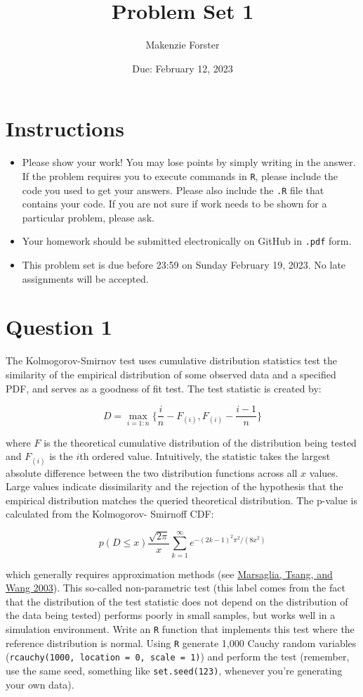\documentclass[12pt,letterpaper]{article}
\title{Problem Set 1}
\date{Due: February 12, 2023}
\author{Makenzie Forster}
\begin{document}
	\maketitle
	\section*{Instructions}
	\begin{itemize}
	\item Please show your work! You may lose points by simply writing in the answer. If the problem requires you to execute commands in \texttt{R}, please include the code you used to get your answers. Please also include the \texttt{.R} file that contains your code. If you are not sure if work needs to be shown for a particular problem, please ask.
\item Your homework should be submitted electronically on GitHub in \texttt{.pdf} form.
\item This problem set is due before 23:59 on Sunday February 19, 2023. No late assignments will be accepted.
	\end{itemize}

	\vspace{.25cm}
\section*{Question 1} 
\vspace{.25cm}
\noindent The Kolmogorov-Smirnov test uses cumulative distribution statistics test the similarity of the empirical distribution of some observed data and a specified PDF, and serves as a goodness of fit test. The test statistic is created by:

$$D = \max_{i=1:n} \Big\{ \frac{i}{n}  - F_{(i)}, F_{(i)} - \frac{i-1}{n} \Big\}$$

\noindent where $F$ is the theoretical cumulative distribution of the distribution being tested and $F_{(i)}$ is the $i$th ordered value. Intuitively, the statistic takes the largest absolute difference between the two distribution functions across all $x$ values. Large values indicate dissimilarity and the rejection of the hypothesis that the empirical distribution matches the queried theoretical distribution. The p-value is calculated from the Kolmogorov-
Smirnoff CDF:

$$p(D \leq x) \frac{\sqrt {2\pi}}{x} \sum _{k=1}^{\infty }e^{-(2k-1)^{2}\pi ^{2}/(8x^{2})}$$


\noindent which generally requires approximation methods (see \href{https://core.ac.uk/download/pdf/25787785.pdf}{Marsaglia, Tsang, and Wang 2003}). This so-called non-parametric test (this label comes from the fact that the distribution of the test statistic does not depend on the distribution of the data being tested) performs poorly in small samples, but works well in a simulation environment. Write an \texttt{R} function that implements this test where the reference distribution is normal. Using \texttt{R} generate 1,000 Cauchy random variables (\texttt{rcauchy(1000, location = 0, scale = 1)}) and perform the test (remember, use the same seed, something like \texttt{set.seed(123)}, whenever you're generating your own data).\\
	
\end{document}
